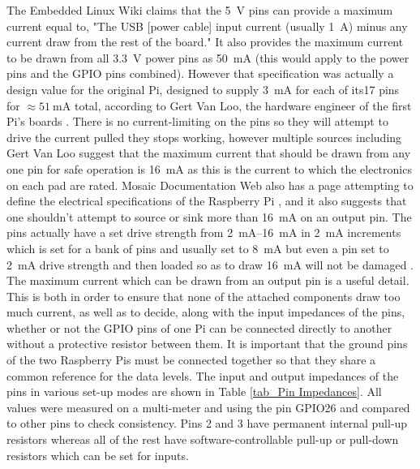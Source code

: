 \documentclass[../main.tex]{subfiles}
\begin{document}
The Embedded Linux Wiki \cite{web_RpiMaxRatings} claims that the \SI{5}{\volt} pins can provide a maximum current equal to, "The USB [power cable] input current (usually \SI{1}{\ampere}) minus any current draw from the rest of the board."
It also provides the maximum current to be drawn from all \SI{3.3}{\volt} power pins as \SI{50}{\milli\ampere} (this would apply to the power pins and the GPIO pins combined).
However that specification was actually a design value for the original Pi, designed to supply \SI{3}{\milli\ampere} for each of its17 pins for $\approx \SI{51}{\milli\ampere}$ total, according to Gert Van Loo, the hardware engineer of the first Pi's boards \cite{web_RPiSpecsSE}.
There is no current-limiting on the pins so they will attempt to drive the current pulled they stops working, however multiple sources including Gert Van Loo suggest that the maximum current that should be drawn from any one pin for safe operation is \SI{16}{\milli\ampere} as this is the current to which the electronics on each pad are rated.
Mosaic Documentation Web also has a page attempting to define the electrical specifications of the Raspberry Pi \cite{web_MosaicSpecs}, and it also suggests that one shouldn't attempt to source or sink more than \SI{16}{\milli\ampere} on an output pin.
The pins actually have a set drive strength from \SIrange{2}{16}{\milli\ampere} in \SI{2}{\milli\ampere} increments which is set for a bank of pins and usually set to \SI{8}{\milli\ampere} but even a pin set to \SI{2}{\milli\ampere} drive strength and then loaded so as to draw \SI{16}{\milli\ampere} will not be damaged \cite{web_GPIOPadsErrata}.\\

The maximum current which can be drawn from an output pin is a useful detail.
This is both in order to ensure that none of the attached components draw too much current, as well as to decide, along with the input impedances of the pins, whether or not the GPIO pins of one Pi can be connected directly to another without a protective resistor between them.
It is important that the ground pins of the two Raspberry Pis must be connected together so that they share a common reference for the data levels.
The input and output impedances of the pins in various set-up modes are shown in Table \ref{tab_Pin Impedances}.
All values were measured on a multi-meter and using the pin GPIO26 and compared to other pins to check consistency.
Pins 2 and 3 have permanent internal pull-up resistors whereas all of the rest have software-controllable pull-up or pull-down resistors which can be set for inputs.\\
\end{document}
